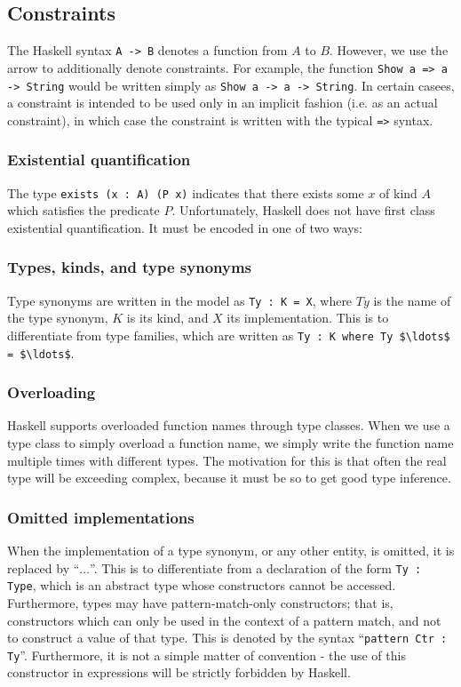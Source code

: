 \subsection{Constraints}
The Haskell syntax \texttt{A -> B} denotes a function from $A$ to $B$. However,
we use the arrow to additionally denote constraints. For example, the function
\texttt{Show a => a -> String} would be written simply as 
\lstinline!Show a -> a -> String!.
In certain casees, a constraint is intended to be used only in an implicit 
fashion 
(i.e. as an actual constraint), in which case the constraint is written with 
the typical \lstinline{=>} syntax. 

\subsubsection{Existential quantification}
The type \lstinline!exists (x : A) (P x)! indicates that there exists some $x$
of kind $A$ which satisfies the predicate $P$. Unfortunately, Haskell does not
have first class existential quantification. It must be encoded in one of
two ways:

\subsubsection{Types, kinds, and type synonyms}
Type synonyms are written in the model as \lstinline!Ty : K = X!, where $Ty$ is 
the name
of the type synonym, $K$ is its kind, and $X$ its implementation. This is to 
differentiate
from type families, which are written as 
\lstinline!Ty : K where Ty $\ldots$ = $\ldots$!.

\subsubsection{Overloading}
Haskell supports overloaded function names through type classes. When we use a 
type 
class to simply overload a function name, we simply write the function name
multiple times with different types. The motivation for this is that often the 
real type will be exceeding complex, because it must be so to get good type 
inference. 

 

\subsubsection{Omitted implementations}
When the implementation of a type synonym, or any other entity, is omitted, it
is replaced by ``$\ldots$''. This is to differentiate from a declaration of the 
form
\lstinline!Ty : Type!, which is an abstract type whose constructors cannot be
accessed. Furthermore, types may have pattern-match-only constructors; that is,
constructors which can only be used in the context of a pattern match, and not
to construct a value of that type. This is denoted by the syntax
``\lstinline!pattern Ctr : Ty!''. Furthermore, it is not a simple matter of
convention - the use of this constructor in expressions will be strictly
forbidden by Haskell.


